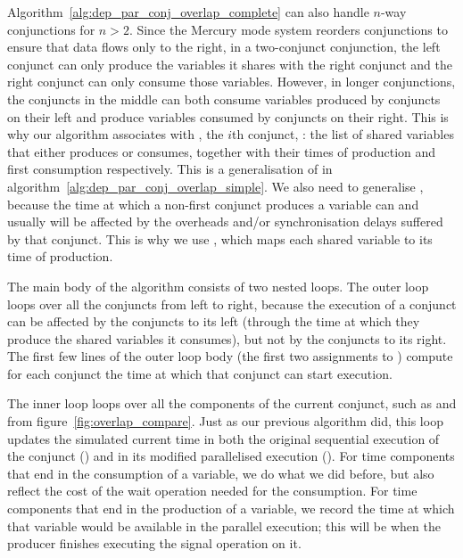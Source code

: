 {Algorithm~\ref{alg:dep_par_conj_overlap_complete}
can also handle $n$-way conjunctions for $n>2$.
Since the Mercury mode system reorders conjunctions
to ensure that data flows only to the right,
in a two-conjunct conjunction,
the left conjunct can only produce
the variables it shares with the right conjunct
and the right conjunct can only consume
those variables.
However, in longer conjunctions,
the conjuncts in the middle
can both consume variables produced by conjuncts on their left
and produce variables consumed by conjuncts on their right.
This is why our algorithm associates with , the $i$th conjunct,
:
the list of shared variables that  either produces or consumes,
together with their times of production and first consumption respectively.
This is a generalisation of  in
algorithm~\ref{alg:dep_par_conj_overlap_simple}.
We also need to generalise ,
because the time at which a non-first conjunct produces a variable
can and usually will be affected
by the overheads and/or synchronisation delays suffered by that conjunct.
This is why we use ,
which maps each shared variable to its time of production.

The main body of the algorithm consists of two nested loops.
The outer loop loops over all the conjuncts from left to right,
because the execution of a conjunct can be affected
by the conjuncts to its left
(through the time at which they produce the shared variables it consumes),
but not by the conjuncts to its right.
The first few lines of the outer loop body
(the first two assignments to )
compute for each conjunct
the time at which that conjunct can start execution.

The inner loop loops over all the components of the current conjunct,
such as  and 
from figure~\ref{fig:overlap_compare}.
Just as our previous algorithm did,
this loop updates the simulated current time
in both the original sequential execution of the conjunct ()
and in its modified parallelised execution ().
For time components that end in the consumption of a variable,
we do what we did before,
but also reflect the cost of the wait operation needed for the consumption.
For time components that end in the production of a variable,
we record the time at which
that variable would be available in the parallel execution;
this will be when the producer finishes executing the signal operation on it.

}
